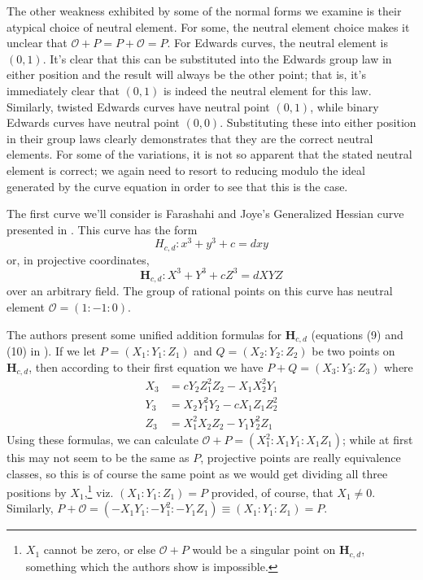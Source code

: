 The other weakness exhibited by some of the normal forms we examine is their
    atypical choice of neutral element.
For some, the neutral element choice makes it unclear that $\mathcal{O} + P = P
    + \mathcal{O} = P$.
For Edwards curves, the neutral element is $(0, 1)$.
It's clear that this can be substituted into the Edwards group law in either
    position and the result will always be the other point; that is, it's
    immediately clear that $(0, 1)$ is indeed the neutral element for this law.
Similarly, twisted Edwards curves have neutral point $(0, 1)$, while binary
    Edwards curves have neutral point $(0, 0)$.
Substituting these into either position in their group laws clearly
    demonstrates that they are the correct neutral elements.
For some of the variations, it is not so apparent that
    the stated neutral element is correct; we again need to resort to reducing
    modulo the ideal generated by the curve equation in order to see that this
    is the case.



The first curve we'll consider is Farashahi and Joye's Generalized Hessian
    curve presented in \cite{farashahi2010efficient}.
This curve has the form
\[
H_{c, d} : x^3 + y^3 + c = dxy
\]
    or, in projective coordinates, 
\[
\mathbf{H}_{c, d} : X^3 + Y^3 + cZ^3 = dXYZ
\]
    over an arbitrary field.
The group of rational points on this curve has neutral element $\mathcal{O} =
    (1 : -1 : 0)$.

The authors present some unified addition formulas for $\mathbf{H}_{c, d}$
    (equations (9) and (10) in \cite{farashahi2010efficient}).
If we let $P = (X_1 : Y_1 : Z_1)$ and $Q = (X_2 : Y_2 : Z_2)$ be two points on
    $\mathbf{H}_{c, d}$, then according to their first equation we have $P + Q
    = (X_3 : Y_3 : Z_3)$ where
\begin{align*}
X_3 &=  cY_2Z_1^2Z_2 - X_1X_2^2Y_1\\
Y_3 &=  X_2Y_1^2Y_2 - cX_1Z_1Z_2^2\\
Z_3 &=  X_1^2X_2Z_2 - Y_1Y_2^2Z_1
\end{align*}
Using these formulas, we can calculate $\mathcal{O} + P = (X_1^2 : X_1Y_1 :
    X_1Z_1)$; while at first this may not seem to be the same as $P$,
    projective points are really equivalence classes, so this is of course the
    same point as we would get dividing all three positions by
    $X_1$,\footnote{$X_1$ cannot be zero, or else $\mathcal{O} + P$ would be a
    singular point on $\mathbf{H}_{c, d}$, something which the authors show is
    impossible.} viz.  $(X_1 : Y_1 : Z_1) = P$ provided, of course, that $X_1
    \ne 0$.
Similarly, $P + \mathcal{O} = (-X_1Y_1 : -Y_1^2 : -Y_1Z_1) \equiv
    (X_1 : Y_1 : Z_1) = P$.

